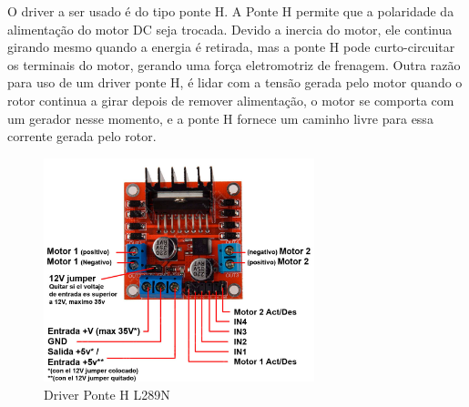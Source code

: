 	O driver a ser usado é do tipo ponte H. A Ponte H permite que a polaridade da alimentação do motor DC seja trocada.
	Devido a inercia do motor, ele continua girando mesmo quando a energia é retirada,  
	mas a ponte H pode curto-circuitar os terminais do motor, gerando uma força eletromotriz de frenagem.
	Outra razão para uso de um driver ponte H, é lidar com a tensão gerada pelo motor quando o rotor continua a girar depois de remover alimentação, 
	o motor se comporta com um gerador nesse momento, e a ponte H fornece um caminho livre para essa corrente gerada pelo rotor.


\begin{figure}[h]
	\centering
	\includegraphics[width=0.7\textwidth]{figures/l289n}
	\caption{Driver Ponte H L289N \cite{l289n}}
\end{figure}
